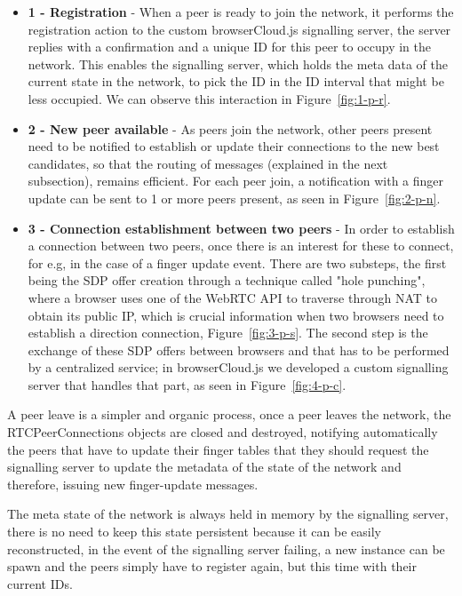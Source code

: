 \begin{itemize}
    \item \textbf{1 - Registration} - When a peer is ready to join the network, it performs the registration action to the custom browserCloud.js signalling server, the server replies with a confirmation and a unique ID for this peer to occupy in the network. This enables the signalling server, which holds the meta data of the current state in the network, to pick the ID in the ID interval that might be less occupied. We can observe this interaction in Figure~\ref{fig:1-p-r}.
    \item \textbf{2 - New peer available} - As peers join the network, other peers present need to be notified to establish or update their connections to the new best candidates, so that the routing of messages (explained in the next subsection), remains efficient. For each peer join, a notification with a finger update can be sent to 1 or more peers present, as seen in Figure~\ref{fig:2-p-n}.
    \item \textbf{3 - Connection establishment between two peers} - In order to establish a connection between two peers, once there is an interest for these to connect, for e.g, in the case of a finger update event. There are two substeps, the first being the SDP offer creation through a technique called "hole punching", where a browser uses one of the WebRTC API to traverse through NAT to obtain its public IP, which is crucial information when two browsers need to establish a direction connection, Figure~\ref{fig:3-p-s}. The second step is the exchange of these SDP offers between browsers and that has to be performed by a centralized service; in browserCloud.js we developed a custom signalling server that handles that part, as seen in Figure~\ref{fig:4-p-c}.
\end{itemize}

A peer leave is a simpler and organic process, once a peer leaves the network, the RTCPeerConnections objects are closed and destroyed, notifying automatically the peers that have to update their finger tables that they should request the signalling server to update the metadata of the state of the network and therefore, issuing new finger-update messages.

The meta state of the network is always held in memory by the signalling server, there is no need to keep this state persistent because it can be easily reconstructed, in the event of the signalling server failing, a new instance can be spawn and the peers simply have to register again, but this time with their current IDs.


